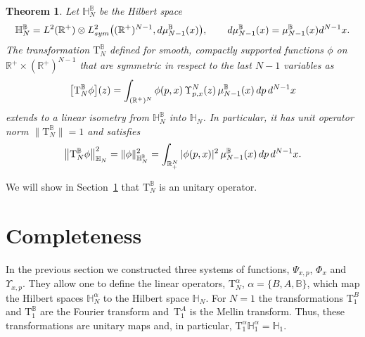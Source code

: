 \documentclass[11pt]{article}
\numberwithin{equation}{section}
\numberwithin{equation}{section}
\newtheorem{Theorem}{Theorem}[section]
\begin{document}
\begin{Theorem}
Let $\mathbb H_N^{\mathbb B}$ be the Hilbert space
\begin{gather*}
\mathbb H_N^{\mathbb B} =L^2(\mathbb R^+)\otimes
L^2_{\rm sym}\big( (\mathbb R^+)^{N-1}, {\rm d}\mu^{\mathbb B}_{N-1}(x)\big),\qquad
{\rm d}\mu^{\mathbb B}_{N-1}(x)=\mu^{\mathbb B}_{N-1}(x) {\rm d}^{N-1}x.
\end{gather*}
The transformation $\mathrm T_N^{\mathbb B}$ defined for smooth, compactly supported functions $\phi$ on $\mathbb{R}^+\times
(\mathbb{R}^+)^{N-1}$ that are symmetric in respect to the last $N-1$ variables as
\begin{gather*}%
\big[ \mathrm T_N^{\mathbb B} \phi\big](z)=\int_{ (\mathbb R^+)^{N}} \phi(p, x)\, \Upsilon^N_{p,{x}}( z)\, \mu_{N-1}^{\mathbb B}( x) \, {\rm d}p\, {\rm d}^{N-1} x
\end{gather*}
extends to a linear isometry from $\mathbb H_N^{\mathbb B}$ into $\mathbb H_N$. In particular, it has unit operator norm \mbox{$\big\|\mathrm T_{N}^{\mathbb B}\big\|=1$} and satisfies
\begin{gather*}
\big\| \mathrm T_N^{\mathbb B} \phi\big\|^2_{ \mathbb H_N } = \| \phi\|^2_{ \mathbb H_N^{\mathbb B} } =
\int_{\mathbb R_+^{N}} |\phi(p, x)|^2\, \mu_{N-1}^{\mathbb B}( x)\, {\rm d}p\,{\rm d}^{N-1} x.
\end{gather*}
\end{Theorem}

We will show in Section~\ref{Section Completude} that $\mathrm T_N^{\mathbb B}$ is an unitary operator.


\section{Completeness}
\label{Section Completude}

In the previous section we constructed three systems of functions, $\Psi_{x,p}$, $\Phi_x$ and $\Upsilon_{x,p}$. They allow one to define
the linear operators, $\mathrm T_N^\alpha$, $\alpha=\{B,A,{\mathbb B}\}$, which map the Hilbert spaces $\mathbb H_N^\alpha$ to the
Hilbert space $\mathbb H_N$. For $N=1$ the transformations $\mathrm T_{1}^B$ and $\mathrm T_{1}^{\mathbb B}$ are the Fourier transform and~$\mathrm T_{1}^{A}$ is the Mellin transform. Thus, these transformations are unitary maps and, in particular, $\mathrm T_{1}^\alpha \mathbb
H_{1}^\alpha=\mathbb H_{1}$.
\end{document}
